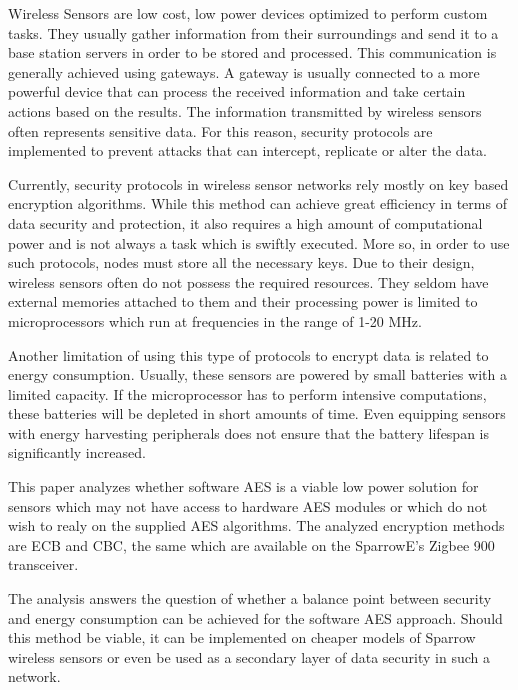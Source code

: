 Wireless Sensors are low cost, low power devices optimized to perform custom tasks. They usually
gather information from their surroundings and send it to a base station servers in order
to be stored and processed. This communication is generally achieved using gateways. A
gateway is usually connected to a more powerful device that can process the received information and take certain actions based on the results. 
The information transmitted by wireless sensors often represents sensitive data. For this reason, security protocols are implemented to 
prevent attacks that can intercept, replicate or alter the data.

Currently, security protocols in wireless sensor networks rely mostly on key based encryption algorithms. While this method can achieve 
great efficiency in terms of data security and protection, it also requires a high amount of computational power and is not 
always a task which is swiftly executed. More so, in order to use such protocols, nodes must store all the necessary keys.
Due to their design, wireless sensors often do not possess the required resources. They seldom have external memories attached 
to them and their processing power is limited to microprocessors which run at frequencies in the range of 1-20 MHz.

Another limitation of using this type of protocols to encrypt data is related to energy consumption. Usually, these sensors are 
powered by small batteries with a limited capacity. If the microprocessor has to perform intensive computations, these batteries 
will be depleted in short amounts of time. Even equipping sensors with energy harvesting peripherals does not ensure that 
the battery lifespan is significantly increased.

This paper analyzes whether software AES is a viable low power solution for sensors which may not have access to hardware AES modules 
or which do not wish to realy on the supplied AES algorithms. The analyzed encryption methods are ECB and CBC, the same which are 
available on the SparrowE's Zigbee 900 transceiver.

The analysis answers the question of whether a balance point between security and energy consumption can be achieved for the software AES approach. 
Should this method be viable, it can be implemented on cheaper models of Sparrow wireless sensors or even be used as a secondary layer of data security 
in such a network.
